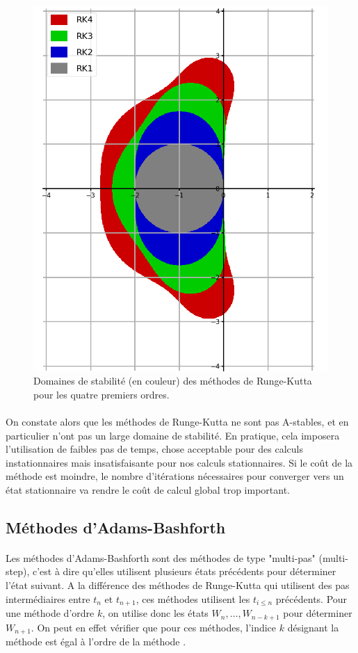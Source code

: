    \begin{figure}
      \centering
      \includegraphics[width=.5\textwidth]{images/rk_stab.png}
      \caption{Domaines de stabilité (en couleur) des méthodes de Runge-Kutta pour les quatre premiers ordres.}
      \label{fig:rk_stab}
    \end{figure}

    \paragraph{}
    On constate alors que les méthodes de Runge-Kutta ne sont pas A-stables, et en particulier n'ont pas un large domaine de stabilité.
    En pratique, cela imposera l'utilisation de faibles pas de temps, chose acceptable pour des calculs instationnaires mais insatisfaisante pour nos calculs stationnaires.
    Si le coût de la méthode est moindre, le nombre d'itérations nécessaires pour converger vers un état stationnaire va rendre le coût de calcul global trop important.


  \subsection{Méthodes d'Adams-Bashforth}

    \paragraph{}
    Les méthodes d'Adams-Bashforth sont des méthodes de type "multi-pas" (multi-step), c'est à dire qu'elles utilisent plusieurs états précédents pour déterminer l'état suivant.
    A la différence des méthodes de Runge-Kutta qui utilisent des pas intermédiaires entre $t_n$ et $t_{n+1}$, ces méthodes utilisent les $t_{i\leq n}$ précédents.
    Pour une méthode d'ordre $k$, on utilise donc les états $W_n, \dots, W_{n-k+1}$ pour déterminer $W_{n+1}$.
    On peut en effet vérifier que pour ces méthodes, l'indice $k$ désignant la méthode est égal à l'ordre de la méthode .

